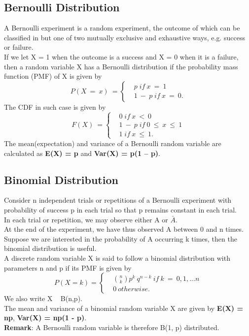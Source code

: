 \subsection*{Bernoulli Distribution}
A Bernoulli experiment is a random experiment, the outcome of
which can be classified in but one of two mutually exclusive and
exhaustive ways, e.g. success or failure.\\
If we let X = 1 when the outcome is a success and X = 0 when it is a
failure, then a random variable X has a Bernoulli distribution if the
probability mass function (PMF) of X is given by
\begin{equation}
P(X\ =\ x)\ = 
    \begin{cases}
    & p\; if\ x\ =\ 1\\
    & 1\ -\ p\; if\ x\ =\ 0.
    \end{cases}
\end{equation}
The CDF in such case is given by
\begin{equation}
F(X)\ =
    \begin{cases}
    & 0\; if\ x\ <\ 0\\
    &1\ -\ p\; if\ 0\ \leq \ x \ \leq\ 1 \\
    &1\; if\ x\ \leq\ 1.
    \end{cases}
\end{equation}
The mean(expectation) and variance of a Bernoulli random variable are calculated as \textbf{E(X) = p} and \textbf{Var(X) = p(1 – p)}.

\subsection*{Binomial Distribution}
Consider n independent trials or repetitions of a Bernoulli
experiment with probability of success p in each trial so that p
remains constant in each trial.\\
In each trial or repetition, we may observe either A or $\bar{A}$.\\
At the end of the experiment, we have thus observed A between 0
and n times.\\
Suppose we are interested in the probability of A occurring k times,
then the binomial distribution is useful.\\
A discrete random variable X is said to follow a binomial distribution
with parameters n and p if its PMF is given by
\begin{equation}
P(X = k) =
    \begin{cases}
    & \binom{n}{k}p^k\ q^{n-k}\ if\ k\ =\ 0,1,...n\\
    & 0\ otherwise.
    \end{cases}
\end{equation}
We also write X ~ B(n,p).\\
The mean and variance of a binomial random variable X are given by \textbf{E(X) = np}, \textbf{Var(X) = np(1 - p)}.\\
\textbf{Remark}: A Bernoulli random variable is therefore B(1, p) distributed.


